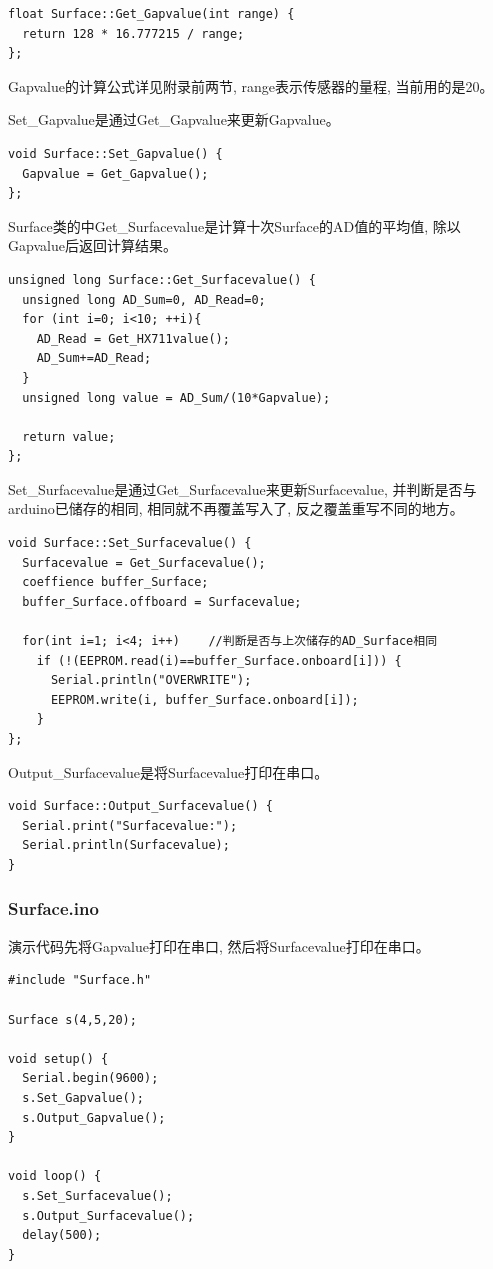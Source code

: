\documentclass{article}
\begin{document}
\begin{lstlisting}
float Surface::Get_Gapvalue(int range) {
  return 128 * 16.777215 / range;
};
\end{lstlisting}
Gapvalue的计算公式详见附录前两节, range表示传感器的量程, 当前用的是20。

Set\_Gapvalue是通过Get\_Gapvalue来更新Gapvalue。
\begin{lstlisting}
void Surface::Set_Gapvalue() {
  Gapvalue = Get_Gapvalue();
};
\end{lstlisting}

Surface类的中Get\_Surfacevalue是计算十次Surface的AD值的平均值, 除以Gapvalue后返回计算结果。
\begin{lstlisting}
unsigned long Surface::Get_Surfacevalue() {
  unsigned long AD_Sum=0, AD_Read=0;
  for (int i=0; i<10; ++i){
    AD_Read = Get_HX711value();
    AD_Sum+=AD_Read;
  }
  unsigned long value = AD_Sum/(10*Gapvalue);

  return value;
};
\end{lstlisting}

Set\_Surfacevalue是通过Get\_Surfacevalue来更新Surfacevalue, 并判断是否与arduino已储存的相同, 相同就不再覆盖写入了, 反之覆盖重写不同的地方。
\begin{lstlisting}
void Surface::Set_Surfacevalue() {
  Surfacevalue = Get_Surfacevalue();
  coeffience buffer_Surface;
  buffer_Surface.offboard = Surfacevalue;

  for(int i=1; i<4; i++)    //判断是否与上次储存的AD_Surface相同
    if (!(EEPROM.read(i)==buffer_Surface.onboard[i])) {
      Serial.println("OVERWRITE");
      EEPROM.write(i, buffer_Surface.onboard[i]);
    }  
};
\end{lstlisting}

Output\_Surfacevalue是将Surfacevalue打印在串口。
\begin{lstlisting}
void Surface::Output_Surfacevalue() {
  Serial.print("Surfacevalue:");
  Serial.println(Surfacevalue);
}
\end{lstlisting}

\subsubsection{Surface.ino}
演示代码先将Gapvalue打印在串口, 然后将Surfacevalue打印在串口。
\begin{lstlisting}
#include "Surface.h"

Surface s(4,5,20);

void setup() {
  Serial.begin(9600);
  s.Set_Gapvalue();
  s.Output_Gapvalue();
}

void loop() {
  s.Set_Surfacevalue();
  s.Output_Surfacevalue();
  delay(500);
}
\end{lstlisting}
\end{document}

